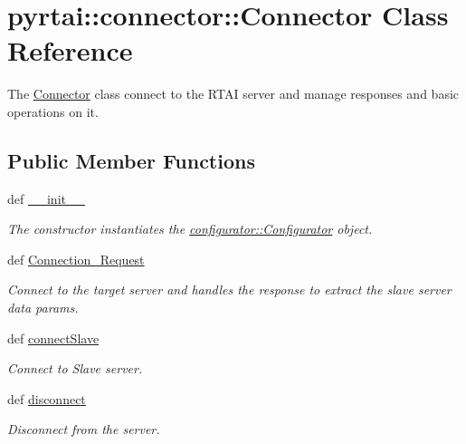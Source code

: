 \hypertarget{classpyrtai_1_1connector_1_1_connector}{
\section{pyrtai\-:\-:connector\-:\-:\-Connector \-Class \-Reference}
\label{classpyrtai_1_1connector_1_1_connector}
}


\-The \hyperlink{classpyrtai_1_1connector_1_1_connector}{\-Connector} class connect to the \-R\-T\-A\-I server and manage responses and basic operations on it.  


\subsection*{\-Public \-Member \-Functions}
\begin{DoxyCompactItemize}
\item 
def \hyperlink{classpyrtai_1_1connector_1_1_connector_a42000f629eb942fd32159dffef89f505}{\-\_\-\-\_\-init\-\_\-\-\_\-}
\begin{DoxyCompactList}\small\item\em \-The constructor instantiates the \hyperlink{classpyrtai_1_1configurator_1_1_configurator}{configurator\-::\-Configurator} object. \end{DoxyCompactList}\item 
def \hyperlink{classpyrtai_1_1connector_1_1_connector_a5fa8fe466e3771102978468a3e565049}{\-Connection\-\_\-\-Request}
\begin{DoxyCompactList}\small\item\em \-Connect to the target server and handles the response to extract the slave server data params. \end{DoxyCompactList}\item 
def \hyperlink{classpyrtai_1_1connector_1_1_connector_a8f01500b2c39628ee4fedc43cbf452ba}{connect\-Slave}
\begin{DoxyCompactList}\small\item\em \-Connect to \-Slave server. \end{DoxyCompactList}\item 
def \hyperlink{classpyrtai_1_1connector_1_1_connector_ad772b8b70a3800af6212a440847aa465}{disconnect}
\begin{DoxyCompactList}\small\item\em \-Disconnect from the server. \end{DoxyCompactList}\item 

\end{DoxyCompactItemize}
